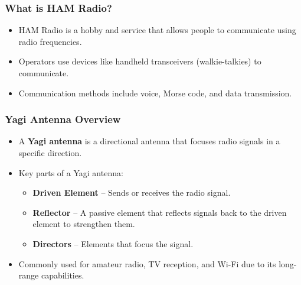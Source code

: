 \documentclass{beamer}
\begin{document}
\begin{frame}
    \frametitle{What is HAM Radio?}
    \begin{itemize}
        \item HAM Radio is a hobby and service that allows people to communicate using radio frequencies.
        \item Operators use devices like handheld transceivers (walkie-talkies) to communicate.
        \item Communication methods include voice, Morse code, and data transmission.
    \end{itemize}
\end{frame}

\begin{frame}
    \frametitle{Yagi Antenna Overview}
    \begin{itemize}
        \item A \textbf{Yagi antenna} is a directional antenna that focuses radio signals in a specific direction.
        \item Key parts of a Yagi antenna:
        \begin{itemize}
            \item \textbf{Driven Element} – Sends or receives the radio signal.
            \item \textbf{Reflector} – A passive element that reflects signals back to the driven element to strengthen them.
            \item \textbf{Directors} – Elements that focus the signal.
        \end{itemize}
        \item Commonly used for amateur radio, TV reception, and Wi-Fi due to its long-range capabilities.
    \end{itemize}
\end{frame}
\end{document}
